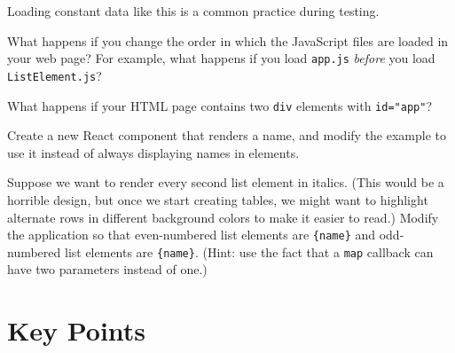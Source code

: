 Loading constant data like this is a common practice during testing.


What happens if you change the order in which the JavaScript files
are loaded in your web page?
For example,
what happens if you load \texttt{app.js} \emph{before} you load \texttt{ListElement.js}?


What happens if your HTML page contains two \texttt{div} elements with \texttt{id="app"}?


Create a new React component that renders a name,
and modify the example to use it instead of always displaying names in \texttt{} elements.


Suppose we want to render every second list element in italics.
(This would be a horrible design,
but once we start creating tables,
we might want to highlight alternate rows in different background colors
to make it easier to read.)
Modify the application so that
even-numbered list elements are \texttt{\{name\}}
and odd-numbered list elements are \texttt{\{name\}}.
(Hint: use the fact that a \texttt{map} callback can have two parameters instead of one.)

\section*{Key Points}


